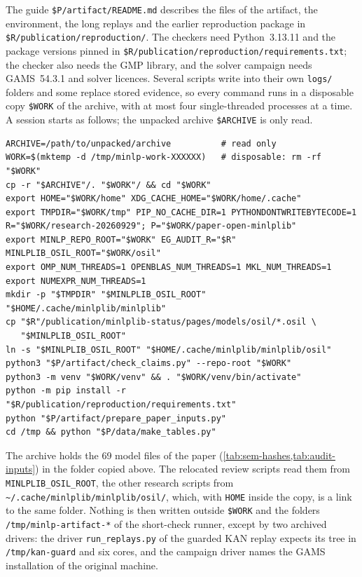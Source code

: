 The guide \nolinkurl{$P/artifact/README.md} describes the files of the artifact, the environment, the long replays and the earlier reproduction package in \nolinkurl{$R/publication/reproduction/}.
The checkers need Python~3.13.11 and the package versions pinned in \nolinkurl{$R/publication/reproduction/requirements.txt}; the  checker also needs the GMP library, and the solver campaign needs GAMS~54.3.1 and solver licences.
Several scripts write into their own \nolinkurl{logs/} folders and some replace stored evidence, so every command runs in a disposable copy \nolinkurl{$WORK} of the archive, with at most four single-threaded processes at a time.
A session starts as follows; the unpacked archive \nolinkurl{$ARCHIVE} is only read.
\begin{verbatim}
ARCHIVE=/path/to/unpacked/archive          # read only
WORK=$(mktemp -d /tmp/minlp-work-XXXXXX)   # disposable: rm -rf "$WORK"
cp -r "$ARCHIVE"/. "$WORK"/ && cd "$WORK"
export HOME="$WORK/home" XDG_CACHE_HOME="$WORK/home/.cache"
export TMPDIR="$WORK/tmp" PIP_NO_CACHE_DIR=1 PYTHONDONTWRITEBYTECODE=1
R="$WORK/research-20260929"; P="$WORK/paper-open-minlplib"
export MINLP_REPO_ROOT="$WORK" EG_AUDIT_R="$R" MINLPLIB_OSIL_ROOT="$WORK/osil"
export OMP_NUM_THREADS=1 OPENBLAS_NUM_THREADS=1 MKL_NUM_THREADS=1
export NUMEXPR_NUM_THREADS=1
mkdir -p "$TMPDIR" "$MINLPLIB_OSIL_ROOT" "$HOME/.cache/minlplib/minlplib"
cp "$R"/publication/minlplib-status/pages/models/osil/*.osil \
   "$MINLPLIB_OSIL_ROOT"
ln -s "$MINLPLIB_OSIL_ROOT" "$HOME/.cache/minlplib/minlplib/osil"
python3 "$P/artifact/check_claims.py" --repo-root "$WORK"
python3 -m venv "$WORK/venv" && . "$WORK/venv/bin/activate"
python -m pip install -r "$R/publication/reproduction/requirements.txt"
python "$P/artifact/prepare_paper_inputs.py"
cd /tmp && python "$P/data/make_tables.py"
\end{verbatim}
The archive holds the 69 model files of the paper (\cref{tab:sem-hashes,tab:audit-inputs}) in the folder copied above.
The relocated review scripts read them from \nolinkurl{MINLPLIB_OSIL_ROOT}, the other research scripts from \nolinkurl{~/.cache/minlplib/minlplib/osil/}, which, with \nolinkurl{HOME} inside the copy, is a link to the same folder.
Nothing is then written outside \nolinkurl{$WORK} and the folders \nolinkurl{/tmp/minlp-artifact-*} of the short-check runner, except by two archived drivers: the driver \nolinkurl{run_replays.py} of the guarded KAN replay expects its tree in \nolinkurl{/tmp/kan-guard} and six cores, and the campaign driver names the GAMS installation of the original machine.
